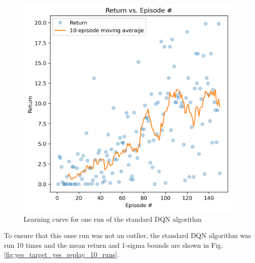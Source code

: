 \documentclass[conference]{IEEEtran}
\begin{document}
\begin{figure}[h]
\centering
\includegraphics[width=\linewidth]{../figures/yes_target_yes_replay/return_150_1000.png}
\caption{Learning curve for one run of the standard DQN algorithm}
\label{fig:yes_target_yes_replay_one_run}
\end{figure}
To ensure that this onse run was not an outlier, the standard DQN algorithm was run 10 times and the mean return and 1-sigma bounds are shown in Fig. \ref{fig:yes_target_yes_replay_10_runs}.
\end{document}
